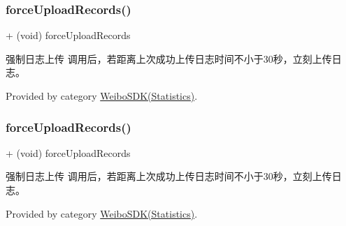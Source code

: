 \mbox{\label{interface_weibo_s_d_k_ab5d6291270ebed0084a505e009bc15a2}} 
\subsubsection{\texorpdfstring{force\+Upload\+Records()}{forceUploadRecords()}\hspace{0.1cm}{\footnotesize\ttfamily [1/3]}}
{\footnotesize\ttfamily + (void) force\+Upload\+Records \begin{DoxyParamCaption}{ }\end{DoxyParamCaption}}

强制日志上传 调用后，若距离上次成功上传日志时间不小于30秒，立刻上传日志。 

Provided by category \mbox{\hyperlink{category_weibo_s_d_k_07_statistics_08_ab5d6291270ebed0084a505e009bc15a2}{Weibo\+S\+D\+K(\+Statistics)}}.

\mbox{\label{interface_weibo_s_d_k_ab5d6291270ebed0084a505e009bc15a2}} 
\subsubsection{\texorpdfstring{force\+Upload\+Records()}{forceUploadRecords()}\hspace{0.1cm}{\footnotesize\ttfamily [2/3]}}
{\footnotesize\ttfamily + (void) force\+Upload\+Records \begin{DoxyParamCaption}{ }\end{DoxyParamCaption}}

强制日志上传 调用后，若距离上次成功上传日志时间不小于30秒，立刻上传日志。 

Provided by category \mbox{\hyperlink{category_weibo_s_d_k_07_statistics_08_ab5d6291270ebed0084a505e009bc15a2}{Weibo\+S\+D\+K(\+Statistics)}}.

\mbox{\label{interface_weibo_s_d_k_ab5d6291270ebed0084a505e009bc15a2}} 
